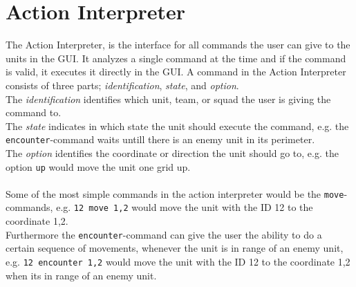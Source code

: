 \section{Action Interpreter}
The Action Interpreter, is the interface for all commands the user can give to the units in the GUI. 
It analyzes a single command at the time and if the command is valid, it executes it directly in the GUI.
A command in the Action Interpreter consists of three parts; \textit{identification}, \textit{state}, and \textit{option}.\\
The \textit{identification} identifies which unit, team, or squad the user is giving the command to.\\
The \textit{state} indicates in which state the unit should execute the command, e.g. the \texttt{encounter}-command waits untill there is an enemy unit in its perimeter.\\
The \textit{option} identifies the coordinate or direction the unit should go to, e.g. the option \texttt{up} would move the unit one grid up.\\
\\
Some of the most simple commands in the action interpreter would be the \texttt{move}-commands, e.g. \texttt{12 move 1,2} would move the unit with the ID 12 to the coordinate 1,2.
\\
Furthermore the \texttt{encounter}-command can give the user the ability to do a certain sequence of movements, whenever the unit is in range of an enemy unit, e.g. \texttt{12 encounter 1,2} would move the unit with the ID 12 to the coordinate 1,2 when its in range of an enemy unit.


